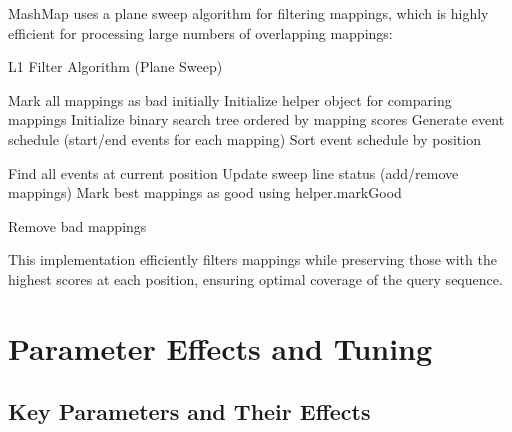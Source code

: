 \documentclass{article}
\begin{document}
MashMap uses a plane sweep algorithm for filtering mappings, which is highly efficient for processing large numbers of overlapping mappings:

\begin{algorithm}
\caption{L1 Filter Algorithm (Plane Sweep)}
\begin{algorithmic}[1]
\State Mark all mappings as bad initially
\State Initialize helper object for comparing mappings
\State Initialize binary search tree ordered by mapping scores
\State Generate event schedule (start/end events for each mapping)
\State Sort event schedule by position

    \State Find all events at current position
    \State Update sweep line status (add/remove mappings)
    \State Mark best mappings as good using helper.markGood
\EndFor

\State Remove bad mappings
\EndProcedure
\end{algorithmic}
\end{algorithm}

This implementation efficiently filters mappings while preserving those with the highest scores at each position, ensuring optimal coverage of the query sequence.

\section{Parameter Effects and Tuning}

\subsection{Key Parameters and Their Effects}
\end{document}
